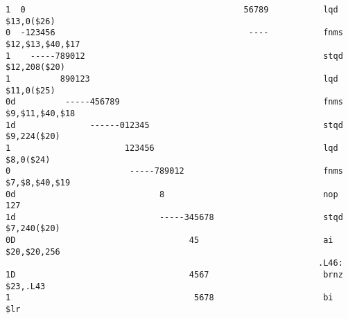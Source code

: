 \begin{verbatim}
1  0                                            56789          	lqd	$13,0($26)
0  -123456                                       ----          	fnms	$12,$13,$40,$17
1    -----789012                                               	stqd	$12,208($20)
1          890123                                              	lqd	$11,0($25)
0d          -----456789                                        	fnms	$9,$11,$40,$18
1d               ------012345                                  	stqd	$9,224($20)
1                       123456                                 	lqd	$8,0($24)
0                        -----789012                           	fnms	$7,$8,$40,$19
0d                             8                               	nop	127
1d                             -----345678                     	stqd	$7,240($20)
0D                                   45                        	ai	$20,$20,256
                                                               .L46:
1D                                   4567                      	brnz	$23,.L43
1                                     5678                     	bi	$lr
\end{verbatim}
